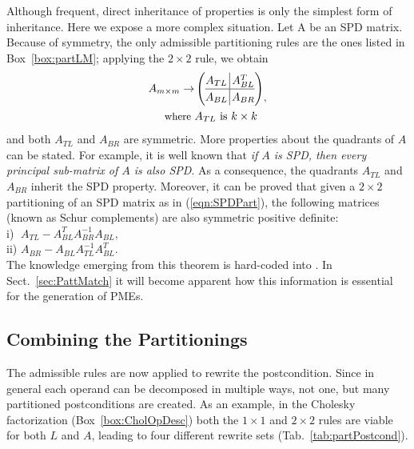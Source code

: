 \documentclass{llncs}
\newcommand{\click}{{\sc{Cl\makebox[.58\width][c]{1}ck}}}
\begin{document}
Although frequent, direct inheritance of properties is only the simplest form of inheritance.
Here we expose a more complex situation.
Let A be an SPD matrix. Because of symmetry, the only admissible partitioning rules are
the ones listed in Box~\ref{box:partLM}; applying the $2 \times 2$ rule, we obtain
\begin{equation}
\label{eqn:SPDPart}
	\begin{aligned}
    \renewcommand{\arraystretch}{1.2}
      A_{m \times m}  
	  \rightarrow &
	  \left(
	    \begin{array}{@{}c@{\,}|@{\,}c@{}} 
		  A_{TL} & A_{BL}^T \\\hline 
		  A_{BL} & A_{BR} 
		\end{array} 
	  \right) \\
      \small \textnormal{where } & A_{TL} \textnormal{ is } k \times k
  \end{aligned},
\end{equation}
and both $A_{TL}$ and $A_{BR}$ are symmetric. More properties about
the quadrants of $A$ can be stated. For example, it is well known that
{\it if $A$ is SPD, then every principal sub-matrix of $A$ is also
  SPD}.  As a consequence, the quadrants $A_{TL}$ and $A_{BR}$ inherit
the SPD property.  Moreover, it can be proved that given a $2 \times
2$ partitioning of an SPD matrix as in (\ref{eqn:SPDPart}), the
following matrices (known as Schur complements) are also symmetric
positive definite:\\[2mm]
\noindent
i) $\;A_{TL} - A_{BL}^{T} A_{BR}^{-1} A_{BL},$\\[1mm]
ii) $A_{BR} - A_{BL} A_{TL}^{-1} A_{BL}^{T}.$\\[-2mm]

The knowledge emerging from this theorem is hard-coded into \click{}.
In Sect.~\ref{sec:PattMatch} it will become apparent how this
information is essential for the generation of PMEs.


\subsection{Combining the Partitionings}

The admissible rules are now applied to rewrite the
postcondition.  Since in general each operand can be decomposed in
multiple ways, not one, but many partitioned postconditions are
created. As an example, in the Cholesky factorization
(Box~\ref{box:CholOpDesc}) both the $1\times 1$ and $2\times 2$ rules
are viable for both $L$ and $A$, leading to four different rewrite sets 
(Tab.~\ref{tab:partPostcond}).
\end{document}
